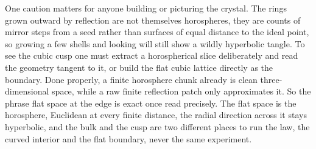 One caution matters for anyone building or picturing the crystal. The rings grown outward by reflection are not themselves horospheres, they are counts of mirror steps from a seed rather than surfaces of equal distance to the ideal point, so growing a few shells and looking will still show a wildly hyperbolic tangle. To see the cubic cusp one must extract a horospherical slice deliberately and read the geometry tangent to it, or build the flat cubic lattice directly as the boundary. Done properly, a finite horosphere chunk already is clean three-dimensional space, while a raw finite reflection patch only approximates it. So the phrase flat space at the edge is exact once read precisely. The flat space is the horosphere, Euclidean at every finite distance, the radial direction across it stays hyperbolic, and the bulk and the cusp are two different places to run the law, the curved interior and the flat boundary, never the same experiment.
